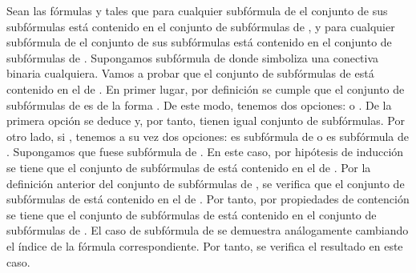 \begin{isabellebody}
\begin{isamarkuptext}
\begin{demostracion}
  Sean las fórmulas  y  tales que para cualquier subfórmula
  de  el conjunto de sus subfórmulas está contenido en el conjunto 
  de subfórmulas de , y para cualquier subfórmula de  el 
  conjunto de sus subfórmulas está contenido en el conjunto de 
  subfórmulas de . Supongamos  
  subfórmula de  donde \isa{{\isacharasterisk}} simboliza una conectiva binaria 
  cualquiera. Vamos a probar que el conjunto de subfórmulas de  está
  contenido en el de . 
  En primer lugar, por definición se cumple que el conjunto de 
  subfórmulas de  es de la forma
  . De este modo,
  tenemos dos opciones:  o .
  De la primera opción se deduce  y, por
  tanto, tienen igual conjunto de subfórmulas. 
  Por otro lado, si , tenemos a su vez dos 
  opciones:  es subfórmula de  o  es subfórmula de .
  Supongamos que fuese subfórmula de . En este caso, por hipótesis 
  de inducción se tiene que el conjunto de subfórmulas de  está 
  contenido en el de . Por la definición anterior del conjunto de 
  subfórmulas de , se verifica que el conjunto de subfórmulas de 
   está contenido en el de . Por tanto, por propiedades de
  contención se tiene que el conjunto de subfórmulas de  está 
  contenido en el conjunto de subfórmulas de . El caso de  
  subfórmula de  se demuestra análogamente cambiando el 
  índice de la fórmula correspondiente. Por tanto, se verifica el 
  resultado en este caso.  
  \end{demostracion}


\end{isamarkuptext}
\end{isabellebody}
